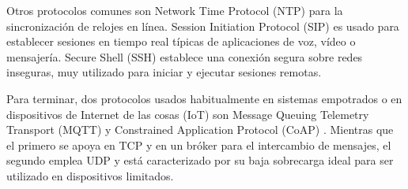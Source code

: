 \begin{description}
  Otros protocolos comunes son Network Time Protocol (NTP) \cite{rfc5905}
  para la sincronización de relojes en línea. Session Initiation Protocol
  (SIP) \cite{rfc3261} es usado para establecer sesiones en tiempo real típicas
  de aplicaciones de voz, vídeo o mensajería. Secure Shell (SSH) \cite{rfc4253}
  establece una conexión segura sobre redes inseguras, muy utilizado para
  iniciar y ejecutar sesiones remotas.

  Para terminar, dos protocolos usados habitualmente en sistemas empotrados o
  en dispositivos de Internet de las cosas (IoT) son Message Queuing Telemetry 
  Transport (MQTT) \cite{banks2015} y Constrained Application Protocol (CoAP)
  \cite{rfc7252}. Mientras que el primero se apoya en TCP y en un bróker para
  el intercambio de mensajes, el segundo emplea UDP y está caracterizado por su
  baja sobrecarga ideal para ser utilizado en dispositivos limitados.
\end{description}
